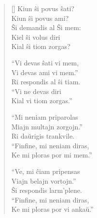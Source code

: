 \begin{verse}[\textwidth]
    Kiun ŝi povus ŝati?\\
    Kiun ŝi povus ami?\\
    Ŝi demandis al Ŝi mem:\\
    Kiel ŝi volus diri\\
    Kial ŝi tiom zorgas?

    ``Vi devas ŝati vi mem,\\
    Vi devas ami vi mem.''\\
    Ri respondis al ŝi tiam.\\
    ``Vi ne devas diri\\
    Kial vi tiom zorgas.''

    ``Mi neniam priparolas\\
    Miajn multajn zorgojn.''\\
    Ri daŭrigis trankvile.\\
    ``Finfine, mi neniam diras,\\
    Ke mi ploras por mi mem.''

    ``Ve, mi ĉiam pripensas\\
    Viajn belajn vortojn.''\\
    Ŝi respondis larm'plene.\\
    ``Finfine, mi neniam diras,\\
    Ke mi ploras por vi ankaŭ.''
\end{verse}
